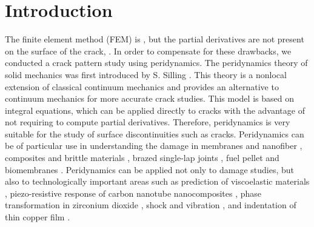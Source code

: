 \section{Introduction}
\label{sec:1}
The finite element method (FEM) is
{},
but the partial derivatives are not present on the surface of the crack,
{}.
In order to compensate for these drawbacks, we conducted a crack pattern study using peridynamics.
The peridynamics theory of solid mechanics was first introduced by S. Silling \cite{Ref1,Ref2,Ref3,Ref4}.
This theory is a nonlocal extension of classical continuum mechanics and provides an alternative to continuum mechanics for more accurate crack studies.
This model is based on integral equations, which can be applied directly to cracks with the advantage of not requiring to compute partial derivatives.
Therefore, peridynamics is very suitable for the study of surface discontinuities such as cracks.
Peridynamics can be of particular use in understanding the damage in membranes and nanofiber \cite{Ref5}, composites and brittle materials \cite{Ref6}, brazed single-lap joints \cite{Ref7}, fuel pellet \cite{Ref8} and biomembranes \cite{Ref9}.
Peridynamics can be applied not only to damage studies, but also to technologically important areas such as prediction of viscoelastic materials \cite{Ref10}, piezo-resistive response of carbon nanotube nanocomposites \cite{Ref11}, phase transformation in zirconium dioxide \cite{Ref12}, shock and vibration \cite{Ref13}, and indentation of thin copper film \cite{Ref14}.
